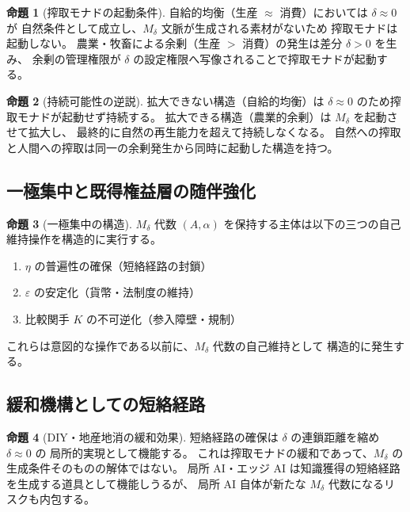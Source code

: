 \documentclass[11pt,a4paper]{ltjsarticle}
\newcommand{\Mdelta}{M_\delta}
\theoremstyle{definition}
\newtheorem{proposition}{命題}[section]
\begin{document}
\begin{proposition}[搾取モナドの起動条件]
自給的均衡（生産 $\approx$ 消費）においては $\delta \approx 0$ が
自然条件として成立し、$\Mdelta$ 文脈が生成される素材がないため
搾取モナドは起動しない。
農業・牧畜による余剰（生産 $>$ 消費）の発生は差分 $\delta > 0$ を生み、
余剰の管理権限が $\delta$ の設定権限へ写像されることで搾取モナドが起動する。
\end{proposition}

\begin{proposition}[持続可能性の逆説]
拡大できない構造（自給的均衡）は $\delta \approx 0$ のため搾取モナドが起動せず持続する。
拡大できる構造（農業的余剰）は $\Mdelta$ を起動させて拡大し、
最終的に自然の再生能力を超えて持続しなくなる。
自然への搾取と人間への搾取は同一の余剰発生から同時に起動した構造を持つ。
\end{proposition}

\subsection{一極集中と既得権益層の随伴強化}

\begin{proposition}[一極集中の構造]
$\Mdelta$ 代数 $(A, \alpha)$ を保持する主体は以下の三つの自己維持操作を構造的に実行する。
\begin{enumerate}
\item $\eta$ の普遍性の確保（短絡経路の封鎖）
\item $\varepsilon$ の安定化（貨幣・法制度の維持）
\item 比較関手 $K$ の不可逆化（参入障壁・規制）
\end{enumerate}
これらは意図的な操作である以前に、$\Mdelta$ 代数の自己維持として
構造的に発生する。
\end{proposition}

\subsection{緩和機構としての短絡経路}

\begin{proposition}[DIY・地産地消の緩和効果]
短絡経路の確保は $\delta$ の連鎖距離を縮め $\delta \approx 0$ の
局所的実現として機能する。
これは搾取モナドの緩和であって、$\Mdelta$ の生成条件そのものの解体ではない。
局所 AI・エッジ AI は知識獲得の短絡経路を生成する道具として機能しうるが、
局所 AI 自体が新たな $\Mdelta$ 代数になるリスクも内包する。
\end{proposition}
\end{document}
